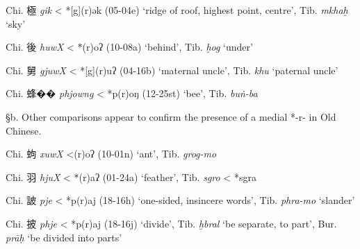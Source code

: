 \begin{description} \item
Chi. 極 \emph{gik} \textless{} *[g](r)ək (05-04e) `ridge of roof,
highest point, centre', Tib. {} \emph{mkhaḫ} `sky'

\item
Chi. 後 \emph{huwX} \textless{} *{}(r)oʔ (10-08a) `behind', Tib. {} \emph{ḫog} `under'

\item
Chi. 舅 \emph{gjuwX} \textless{} *[g](r)uʔ (04-16b) `maternal
uncle', Tib. {} \emph{khu} `paternal uncle'

\item
Chi. 蜂�� \emph{phjowng} \textless{} *p{}(r)oŋ (12-25st) `bee', Tib. {}
\emph{buṅ-ba}
\end{description}

§b. Other comparisons appear to confirm the presence of a medial *-r- in
Old Chinese.

\begin{description} \item
Chi. 蚼 \emph{xuwX} \textless{}{}{}(r)oʔ (10-01n) `ant', Tib. {} \emph{grog-mo}

\item
Chi. 羽 \emph{hjuX} \textless{} *{}(r)aʔ (01-24a) `feather', Tib. {} \emph{sgro} \textless{} *sg{}ra

\item
Chi. 詖 \emph{pje} \textless{} *p(r)aj (18-16h) `one-sided, insincere
words', Tib. {} \emph{phra-mo} `slander'

\item
Chi. 披 \emph{phje }\textless{} *p{}(r)aj (18-16j) `divide', Tib. {} \emph{ḫbral} `be separate, to part', Bur. {} \emph{prāḥ} `be divided
into parts'
\end{description}


